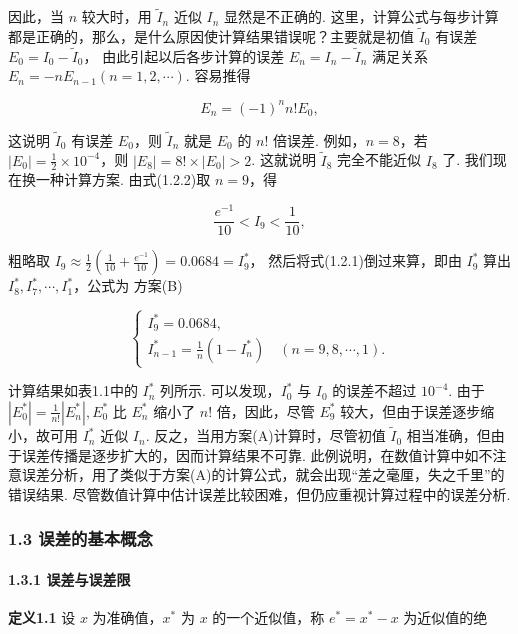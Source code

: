 \documentclass[
  10pt,
  fontset=fandol]{ctexart}
\begin{document}
因此，当 \(n\) 较大时，用 \(\tilde{I}_n\) 近似 \(I_n\) 显然是不正确的. 这里，计算公式与每步计算都是正确的，那么，是什么原因使计算结果错误呢？主要就是初值 \(\tilde{I}_0\) 有误差 \(E_0 = I_0 - \tilde{I}_0\)， 由此引起以后各步计算的误差 \(E_n = I_n - \tilde{I}_n\) 满足关系 \(E_n = -nE_{n-1}(n=1,2,\cdots)\). 容易推得

\[
E_n = (-1)^n n! E_0,
\]

这说明 \(\tilde{I}_0\) 有误差 \(E_0\)，则 \(\tilde{I}_n\) 就是 \(E_0\) 的 \(n!\) 倍误差. 例如，\(n=8\)，若 \(|E_0| = \frac{1}{2} \times 10^{-4}\)，则 \(|E_8| = 8! \times |E_0| > 2\). 这就说明 \(\tilde{I}_8\) 完全不能近似 \(I_8\) 了. 我们现在换一种计算方案. 由式(1.2.2)取 \(n=9\)，得

\[
\frac{e^{-1}}{10} < I_9 < \frac{1}{10},
\]

粗略取 \(I_9 \approx \frac{1}{2}\left(\frac{1}{10} + \frac{e^{-1}}{10}\right) = 0.0684 = I_9^*\)， 然后将式(1.2.1)倒过来算，即由 \(I_9^*\) 算出 \(I_8^*, I_7^*, \cdots, I_1^*\)，公式为 方案(B)

\[
\begin{cases} I_9^* = 0.0684, \\ I_{n-1}^* = \frac{1}{n}(1 - I_n^*) \quad (n = 9, 8, \cdots, 1). \end{cases}
\]

计算结果如表1.1中的 \(I_n^*\) 列所示. 可以发现，\(I_0^*\) 与 \(I_0\) 的误差不超过 \(10^{-4}\). 由于 \(|E_0^*| = \frac{1}{n!}|E_n^*|, E_0^*\) 比 \(E_n^*\) 缩小了 \(n!\) 倍，因此，尽管 \(E_9^*\) 较大，但由于误差逐步缩小，故可用 \(I_n^*\) 近似 \(I_n\). 反之，当用方案(A)计算时，尽管初值 \(\tilde{I}_0\) 相当准确，但由于误差传播是逐步扩大的，因而计算结果不可靠. 此例说明，在数值计算中如不注意误差分析，用了类似于方案(A)的计算公式，就会出现``差之毫厘，失之千里''的错误结果. 尽管数值计算中估计误差比较困难，但仍应重视计算过程中的误差分析.

\subsubsection{1.3 误差的基本概念}\label{ux8befux5deeux7684ux57faux672cux6982ux5ff5}

\paragraph{1.3.1 误差与误差限}\label{ux8befux5deeux4e0eux8befux5deeux9650}

\textbf{定义1.1} 设 \(x\) 为准确值，\(x^*\) 为 \(x\) 的一个近似值，称 \(e^* = x^* - x\) 为近似值的绝
\end{document}
